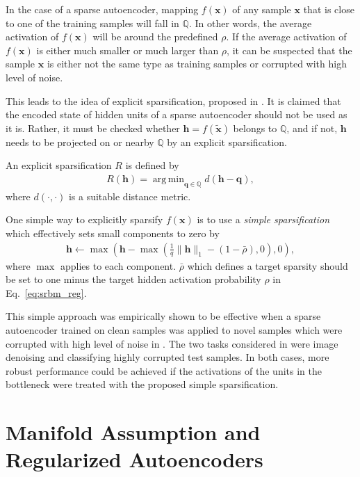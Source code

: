 \documentclass[dissertation,nocontribution]{aaltoseries}
\newcommand{\vect}[1]{\mathbf{#1}}
\newcommand{\vh}[0]{\vect{h}}
\newcommand{\vx}[0]{\vect{x}}
\newcommand{\vq}[0]{\vect{q}}
\newcommand{\QQ}[0]{\mathbb{Q}}
\DeclareMathOperator*{\argmin}{arg\,min}
\begin{document}
In the case of a sparse autoencoder, mapping $f(\vx)$ of any
sample $\vx$ that is close to one of the training samples will
fall in $\QQ$. In other words, the average activation of
$f(\vx)$ will be around the predefined $\rho$. If the
average activation of $f(\vx)$ is either much smaller or
much larger than $\rho$, it can be suspected that the sample
$\vx$ is either not the same type as training samples or
corrupted with high level of noise.

This leads to the idea of explicit sparsification, proposed
in . It is claimed that the encoded
state of hidden units of a sparse autoencoder should not be
used as it is. Rather, it must be checked whether $\vh =
f(\tilde{\vx})$ belongs to $\QQ$, and if not, $\vh$ needs to
be projected on or nearby $\QQ$ by an explicit
sparsification.

An explicit sparsification $R$ is defined by 
\begin{align}
    \label{eq:esp}
    R(\vh) = \argmin_{\vq \in \QQ} d(\vh - \vq),
\end{align}
where $d(\cdot, \cdot)$ is a suitable distance metric.

One simple way to explicitly sparsify $f(\vx)$ is to use a
\textit{simple sparsification} which effectively sets small
components to zero by
\begin{align}
    \label{eq:simple_sparsification}
    \vh \leftarrow \max\left(\vh - \max\left(\frac{1}{q}
    \|\vh\|_1 - \left(1 - \bar{\rho}\right), 0\right),
    0\right),
\end{align}
where $\max$ applies to each component. 
$\bar{\rho}$ which defines a target sparsity should be set to one
minus the target hidden activation probability $\rho$ in
Eq.~\eqref{eq:srbm_reg}.

This simple approach was empirically shown to be effective
when a sparse autoencoder trained on clean samples was
applied to novel samples which were corrupted with high
level of noise in . The two tasks
considered in  were image
denoising and classifying highly corrupted test
samples. In both cases, more robust performance could be
achieved if the activations of the units in the bottleneck
were treated with the proposed simple sparsification.

\section{Manifold Assumption and Regularized Autoencoders}
\label{sec:dae_cae}
\end{document}
